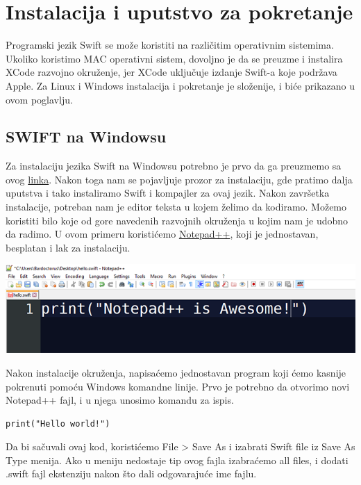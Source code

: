 \documentclass[a4paper]{article}
\begin{document}
\section{Instalacija i uputstvo za pokretanje}	
\label{sec:petiDeo}

Programski jezik Swift se može koristiti na različitim operativnim sistemima. Ukoliko koristimo MAC operativni sistem, dovoljno je da se preuzme i instalira XCode razvojno okruženje, jer XCode uključuje izdanje Swift-a koje podržava Apple. Za Linux i Windows instalacija i pokretanje je složenije, i biće prikazano u ovom poglavlju.

\subsection{SWIFT na Windowsu}
\label{subsec:podnaslovWindows}

Za instalaciju jezika Swift na Windowsu potrebno je prvo da ga preuzmemo sa ovog \href{https://swiftforwindows.github.io}{linka}. Nakon toga nam se pojavljuje prozor za instalaciju, gde pratimo dalja uputstva i tako instaliramo Swift i kompajler za ovaj jezik. Nakon završetka instalacije, potreban nam je editor teksta u kojem želimo da kodiramo. Možemo koristiti bilo koje od gore navedenih razvojnih okruženja u kojim nam je udobno da radimo. U ovom primeru koristićemo \href{https://notepad-plus-plus.org/download/v7.6.4.html}{Notepad++}, koji je jednostavan, besplatan i lak za instalaciju.
\vspace{2mm}

\includegraphics[scale=0.5]{notepadpp.png}
\vspace{2mm}

Nakon instalacije okruženja, napisaćemo jednostavan program koji ćemo kasnije pokrenuti pomoću Windows komandne linije. Prvo je potrebno da otvorimo novi Notepad++ fajl, i u njega unosimo komandu za ispis.

\begin{lstlisting}[caption={},frame=single, label=simple]
print("Hello world!")
\end{lstlisting}
\vspace{3mm}
Da bi sačuvali ovaj kod, koristićemo File > Save As i izabrati Swift file iz Save As Type menija. Ako u meniju nedostaje tip ovog fajla izabraćemo all files, i dodati .swift fajl ekstenziju nakon što dali odgovarajuće ime fajlu.
\end{document}
